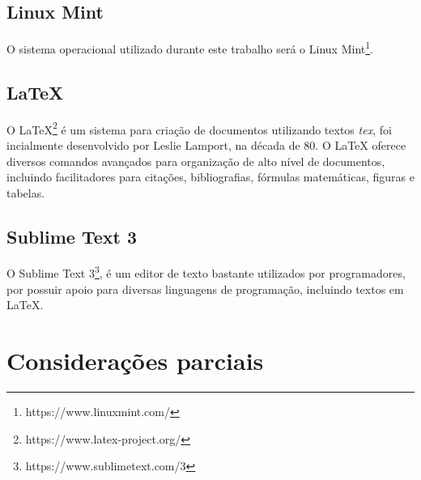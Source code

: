 	\subsection{Linux Mint} %
	\label{sub:linux_mint}
		O sistema operacional utilizado durante este trabalho será o Linux Mint\footnote{https://www.linuxmint.com/}.

	\subsection{LaTeX} %
	\label{sub:latex}
	
	O LaTeX\footnote{https://www.latex-project.org/} é um sistema para criação de documentos utilizando textos \textit{tex}, foi incialmente desenvolvido por Leslie Lamport, na década de 80. O LaTeX oferece diversos comandos avançados para organização de alto nível de documentos, incluindo facilitadores para citações, bibliografias, fórmulas matemáticas, figuras e tabelas.

	\subsection{Sublime Text 3} %
	\label{sub:sublime_text_3}
		O Sublime Text 3\footnote{https://www.sublimetext.com/3}, é um editor de texto bastante utilizados por programadores, por possuir apoio para diversas linguagens de programação, incluindo textos em LaTeX.

	
	
\section{Considerações parciais} %
\label{sec:considerações_parciais}


